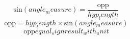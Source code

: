 \[\text{{sin}}({angle_measure})=\frac{{\text{{{opp}}}}}{{{hyp_length}}}\]
\[\text{{{opp}}}={hyp_length}\times \text{{sin}}({angle_measure})\]
\[\text{{{opp}}}{equal_sign}{result_with_unit}\]
